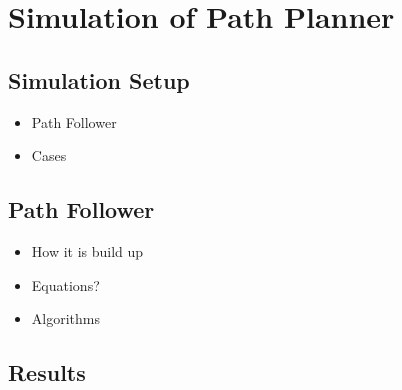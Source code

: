 \section{Simulation of Path Planner}



\subsection{Simulation Setup}

\begin{itemize}
	\item Path Follower
	\item Cases
\end{itemize}


\subsection{Path Follower}
\label{ch:path_follower}

\begin{itemize}
	\item How it is build up
	\item Equations?
	\item Algorithms
\end{itemize}


\subsection{Results}